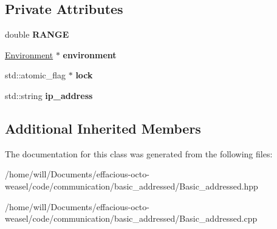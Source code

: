 \subsection*{Private Attributes}
\begin{DoxyCompactItemize}
\item 
double {\bfseries R\+A\+N\+GE}\hypertarget{class_basic__addressed_ab034a50f20042c6902c46aac50ab6d59}{}\label{class_basic__addressed_ab034a50f20042c6902c46aac50ab6d59}

\item 
\hyperlink{class_environment}{Environment} $\ast$ {\bfseries environment}\hypertarget{class_basic__addressed_a08745dd03e78126fa4921c63b3eb1f6e}{}\label{class_basic__addressed_a08745dd03e78126fa4921c63b3eb1f6e}

\item 
std\+::atomic\+\_\+flag $\ast$ {\bfseries lock}\hypertarget{class_basic__addressed_ae89d21666c064b0bae2baecb6a161598}{}\label{class_basic__addressed_ae89d21666c064b0bae2baecb6a161598}

\item 
std\+::string {\bfseries ip\+\_\+address}\hypertarget{class_basic__addressed_ab379c6caf755034091cb471c0210cdd3}{}\label{class_basic__addressed_ab379c6caf755034091cb471c0210cdd3}

\end{DoxyCompactItemize}
\subsection*{Additional Inherited Members}


The documentation for this class was generated from the following files\+:\begin{DoxyCompactItemize}
\item 
/home/will/\+Documents/effacious-\/octo-\/weasel/code/communication/basic\+\_\+addressed/Basic\+\_\+addressed.\+hpp\item 
/home/will/\+Documents/effacious-\/octo-\/weasel/code/communication/basic\+\_\+addressed/Basic\+\_\+addressed.\+cpp\end{DoxyCompactItemize}
